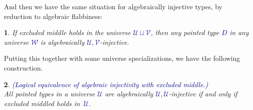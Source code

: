 \documentclass[10pt]{article}
\newcommand{\db}{\textcolor{darkblue}}
\newcommand{\df}[1]{\emph{\db{#1}}}
\newcommand{\m}[1]{\db{$#1$}}
\newcommand{\U}{\mathcal{U}}
\newcommand{\V}{\mathcal{V}}
\newcommand{\W}{\mathcal{W}}
\newcommand{\Zero}{\mathbbm{O}}
\newcommand{\One}{\mathbbm{1}}
\newtheorem{numbered}{}
\theoremstyle{definition}
\begin{document}
\noindent
And then we have the same situation for algebraically injective types,
by reduction to algebraic flabbiness:
\begin{numbered}
  If excluded middle holds in the universe \m{\U \sqcup \V}, then any
  pointed type \m{D} in any universe \m{\W} is algebraically
  \m{\U,\V}-injective.
\end{numbered}
\noindent Putting this together with some universe specializations, we
have the following construction.
\begin{numbered} \df{(Logical equivalence of algebraic injectivity with excluded middle.)} \\
  All pointed types in a universe \m{\U} are algebraically \m{\U,\U}-injective if and only if excluded middled holds in~\m{\U}.
\end{numbered}
\end{document}

